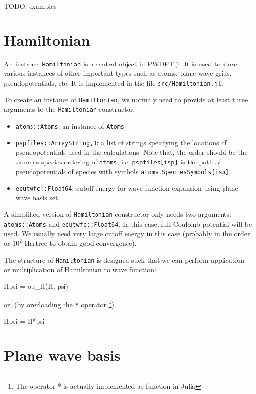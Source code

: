 \documentclass[a4paper,10pt]{paper}
\newcommand{\jlcode}[1]{\texttt{#1}}
\begin{document}
TODO: examples

\section{Hamiltonian}

An instance \jlcode{Hamiltonian} is a central object in \textsf{PWDFT.jl}.
It is used to store various instances of other important types
such as atoms, plane wave grids, pseudopotentials, etc.
It is implemented in the file \texttt{src/Hamiltonian.jl}.

To create an instance of \jlcode{Hamiltonian}, we normaly need to provide at least
three arguments to the \jlcode{Hamiltonian} constructor:
%
\begin{itemize}
%
\item \jlcode{atoms::Atoms}: an instance of \jlcode{Atoms}
%
\item \jlcode{pspfiles::Array{String,1}}: a list of strings specifying the
  locations of pseudopotentials used in the
  calculations. Note that, the order should be the same as species ordering
  of \jlcode{atoms}, i.e. \jlcode{pspfiles[isp]} is the path of
  pseudopotentials of species with symbols \jlcode{atoms.SpeciesSymbols[isp]}.
%
\item \jlcode{ecutwfc::Float64}: cutoff energy for wave function
  expansion using plane wave basis set.
\end{itemize}

A simplified version of \jlcode{Hamiltonian} constructor only needs two arguments:
\jlcode{atoms::Atoms} and \jlcode{ecutwfc::Float64}. In this case, full Coulomb potential
will be used. We usually need very large cutoff energy in this case (probably
in the order or $10^2$ Hartree to obtain good convergence).

The structure of \jlcode{Hamiltonian} is designed such that we can perform
application or multiplication of Hamiltonian to wave function:
%
\begin{juliacode}
Hpsi = op_H(H, psi)
\end{juliacode}
%
or, (by overloading the \jlcode{*} operator
\footnote{The operator * is actually implemented as function in Julia})
%
\begin{juliacode}
Hpsi = H*psi
\end{juliacode}


\section{Plane wave basis}
\end{document}
